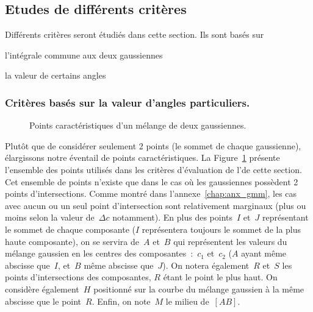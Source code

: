 \documentclass[main.tex]{subfiles}
\begin{document}
\subsection{Etudes de différents critères}
Différents critères seront étudiés dans cette section. Ils sont basés sur
\begin{myitemize}
\item l'intégrale commune aux deux gaussiennes
\item la valeur de certains angles
\end{myitemize}

\subsubsection{Critères basés sur la valeur d'angles particuliers.}
\begin{figure}
\centering
{}\quad
{}
\caption{\label{fig:pts_carac_intersection_gaussienne}Points caractéristiques d'un mélange de deux gaussiennes.}
\end{figure}

Plutôt que de considérer seulement 2 points (le sommet de chaque gaussienne), élargissons notre éventail de points caractéristiques. La Figure~\ref{fig:pts_carac_intersection_gaussienne} présente l'ensemble des points utilisés dans les critères d'évaluation de l'\hetero de cette section. Cet ensemble de points n'existe que dans le cas où les gaussiennes possèdent 2 points d'intersections. Comme montré dans l'annexe~\ref{chap:anx_gmm}, les cas avec aucun ou un seul point d'intersection sont relativement marginaux (plus ou moins selon la valeur de~$\Delta c$ notamment). En plus des points~$I$ et~$J$ représentant le sommet de chaque composante ($I$ représentera toujours le sommet de la plus haute composante), on se servira de~$A$ et~$B$ qui représentent les valeurs du mélange gaussien en les centres des composantes~:~$c_1$ et~$c_2$ ($A$ ayant même abscisse que~$I$, et~$B$ même abscisse que~$J$). On notera également~$R$ et~$S$ les points d'intersections des composantes, $R$ étant le point le plus haut. On  considère également~$H$ positionné sur la courbe du mélange gaussien à la même abscisse que le point~$R$. Enfin, on note~$M$ le milieu de~$[AB]$. 
\end{document}
